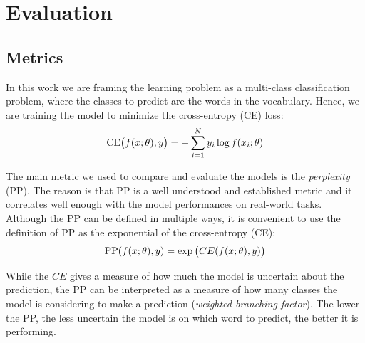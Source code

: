 
\section{Evaluation}
\label{sec:5_eval}
\subsection{Metrics}
In this work we are framing the learning problem as a multi-class classification problem, where the classes to predict are the words in the vocabulary. Hence, we are training the model to minimize the cross-entropy (CE) loss:
\begin{equation}
    \text{CE} \parenth[\big]{f(x; \theta), y} = -\sum_{i=1}^{N} y_i \log{f(x_i; \theta)}
\end{equation}

The main metric we used to compare and evaluate the models is the \emph{perplexity} (PP). The reason is that PP is a well understood and established metric and it correlates well enough with the model performances on real-world tasks. Although the PP can be defined in multiple ways, it is convenient to use the definition of PP as the exponential of the cross-entropy (CE):
\begin{equation}
    \text{PP}(f(x; \theta), y) = \exp \parenth[\big]{CE(f(x; \theta), y)}
\end{equation}

While the $CE$ gives a measure of how much the model is uncertain about the prediction, the PP can be interpreted as a measure of how many classes the model is considering to make a prediction (\emph{weighted branching factor}). The lower the PP, the less uncertain the model is on which word to predict, the better it is performing.

